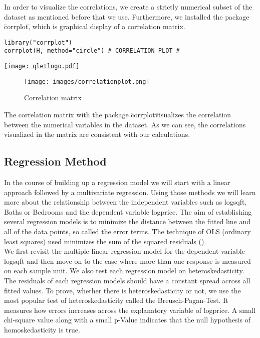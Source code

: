 In order to visualize the correlations, we create a strictly numerical subset of the dataset as mentioned before that we use. Furthermore, we installed the package \"corrplot\", which is graphical display of a correlation matrix. \\

\begin{lstlisting}[frame = single,backgroundcolor=\color{hellgelb}]
library("corrplot")
corrplot(H, method="circle") # CORRELATION PLOT #
\end{lstlisting} \href{https://github.com/arminecseri/SPL-SOSE-17/blob/master/correlationmatrix.R}{\texttt{[image: qletlogo.pdf]}}


\begin{wrapfigure}{l}{0.5\textwidth}
  \begin{center}
	\texttt{[image: images/correlationplot.png]}
  \end{center}
  \caption{Correlation matrix}
\end{wrapfigure}


The correlation matrix with the package \"corrplot\" visualizes the correlation between the numerical variables in the dataset. As we can see, the correlations visualized in the matrix are consistent with our calculations. \\


\subsection{Regression Method}

In the course of building up a regression model we will start with a linear approach followed by a multivariate regression. Using those methods we will learn more about the relationship between the independent variables such as logsqft, Baths or Bedrooms and the dependent variable logprice. The aim of establishing several regression models is to minimize the distance between the fitted line and all of the data points, so called the error terms. The technique of OLS (ordinary least squares) used minimizes the sum of the squared residuals (\cite{regression}). \\ %

We first revisit the multiple linear regression model for the dependent variable logsqft and then move on to the case where more than one response is measured on each sample unit. We also test each regression model on heteroskedasticity. The residuals of each regression models should have a constant spread across all fitted values. To prove, whether there is heteroskedasticity or not, we use the most popular test of heteroskedasticity called the Breusch-Pagan-Test. It measures how errors increases across the explanatory variable of logprice. A small chi-square value along with a small p-Value indicates that the null hypothesis of homoskedasticity is true. \\


